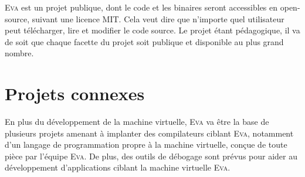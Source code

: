 \documentclass[11pt,twoside,french]{article}
\newcommand{\noun}[1]{\textsc{#1}}
\begin{document}
\noun{Eva} est un projet publique, dont le code et les binaires seront
accessibles en open-source, suivant une licence MIT. Cela veut dire
que n'importe quel utilisateur peut télécharger, lire et modifier
le code source. Le projet étant pédagogique, il va de soit que chaque
facette du projet soit publique et disponible au plus grand nombre.

\section{Projets connexes}

En plus du développement de la machine virtuelle, \noun{Eva} va être
la base de plusieurs projets amenant à implanter des compilateurs
ciblant \noun{Eva}, notamment d'un langage de programmation propre
à la machine virtuelle, conçue de toute pièce par l'équipe \noun{Eva}.
De plus, des outils de débogage sont prévus pour aider au développement
d'applications ciblant la machine virtuelle \noun{Eva}.
\end{document}
